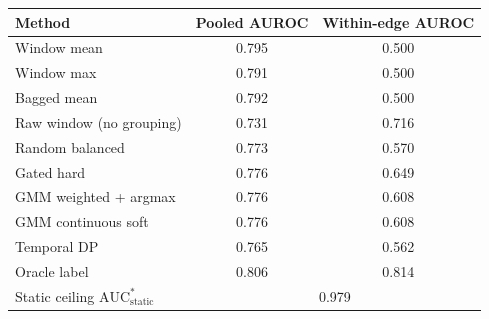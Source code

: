 \begin{tabular}{lcc}
\toprule
Method & Pooled AUROC & Within-edge AUROC \\
\midrule
Window mean & 0.795 & 0.500 \\
Window max & 0.791 & 0.500 \\
Bagged mean & 0.792 & 0.500 \\
Raw window (no grouping) & 0.731 & 0.716 \\
Random balanced & 0.773 & 0.570 \\
Gated hard & 0.776 & 0.649 \\
GMM weighted + argmax & 0.776 & 0.608 \\
GMM continuous soft & 0.776 & 0.608 \\
Temporal DP & 0.765 & 0.562 \\
Oracle label & 0.806 & 0.814 \\
\midrule
Static ceiling $\mathrm{AUC}^*_{\mathrm{static}}$ & \multicolumn{2}{c}{0.979} \\
\bottomrule
\end{tabular}
